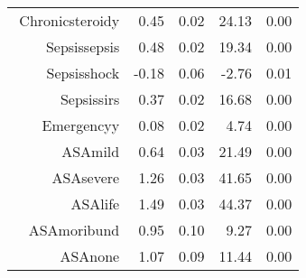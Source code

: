 \begin{tabular}{rrrrr}
$$  Chronic\-steroid\-y & 0.45 & 0.02 & 24.13 & 0.00 \\ 
  Sepsis\-sepsis & 0.48 & 0.02 & 19.34 & 0.00 \\ 
  Sepsis\-shock & -0.18 & 0.06 & -2.76 & 0.01 \\ 
  Sepsis\-sirs & 0.37 & 0.02 & 16.68 & 0.00 \\ 
  Emergency\-y & 0.08 & 0.02 & 4.74 & 0.00 \\ 
  ASA\-mild & 0.64 & 0.03 & 21.49 & 0.00 \\ 
  ASA\-severe & 1.26 & 0.03 & 41.65 & 0.00 \\ 
  ASA\-life & 1.49 & 0.03 & 44.37 & 0.00 \\ 
  ASA\-moribund & 0.95 & 0.10 & 9.27 & 0.00 \\ 
  ASA\-none & 1.07 & 0.09 & 11.44 & 0.00 \\ 
   \hline
\end{tabular}

